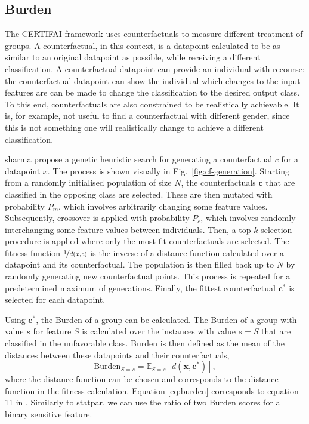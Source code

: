 \documentclass[runningheads]{llncs}
\begin{document}
\subsection{Burden}\label{sec:burden}

The CERTIFAI framework \cite{certifai} uses counterfactuals to measure different treatment of groups. A counterfactual, in this context, is a datapoint calculated to be as similar to an original datapoint as possible, while receiving a different classification. A counterfactual datapoint can provide an individual with \gls{recourse}: 
the counterfactual datapoint can show the individual which changes to the input features are can be made to change the classification to the desired output class. To this end, counterfactuals are also constrained to be realistically achievable. It is, for example, not useful to find a counterfactual with different gender, since this is not something one will realistically change to achieve a different classification.

\Gls{sharma} propose a genetic heuristic search for generating a counterfactual $c$ for a datapoint $x$. The process is shown visually in Fig.~\ref{fig:cf-generation}. Starting from a randomly initialised population of size $N$, the counterfactuals $\mathbf{c}$ that are classified in the opposing class are selected. These are then mutated with probability $P_m$, which involves arbitrarily changing some feature values. Subsequently, crossover is applied with probability $P_c$, which involves randomly interchanging some feature values between individuals. Then, a top-$k$ selection procedure is applied where only the most fit counterfactuals are selected. The fitness function $\nicefrac{1}{d(x,c)}$ is the inverse of a distance function calculated over a datapoint and its counterfactual. The population is then filled back up to $N$ by randomly generating new counterfactual points. This process is repeated for a predetermined maximum of generations. Finally, the fittest counterfactual $\mathbf{c^*}$ is selected for each datapoint.

Using $\mathbf{c^*}$, the \gls{Burden} of a group can be calculated. The Burden of a group with value $s$ for feature $S$ is calculated over the instances with value $s=S$ that are classified in the unfavorable class. Burden is then defined as the mean of the distances between these datapoints and their counterfactuals,
\begin{equation}\label{eq:burden}
    \text{Burden}_{S=s} = \mathbb{E}_{S=s}[d(\mathbf{x}, \mathbf{c^*})],
\end{equation}
where the distance function can be chosen and corresponds to the distance function in the fitness calculation. Equation \ref{eq:burden} corresponds to equation 11 in \cite{certifai}. Similarly to \gls{statpar}, we can use the ratio of two \gls{Burden} scores for a binary sensitive feature. 
\end{document}
